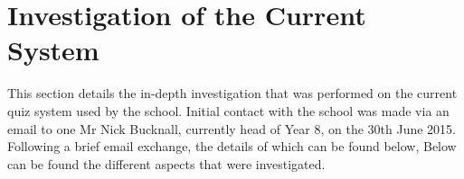 \section{Investigation of the Current System}
This section details the in-depth investigation that was performed on the current quiz system used by the school. Initial contact with the school was made via an email to one Mr Nick Bucknall, currently head of Year 8, on the 30th June 2015. Following a brief email exchange, the details of which can be found below, Below can be found the different aspects that were investigated.

















